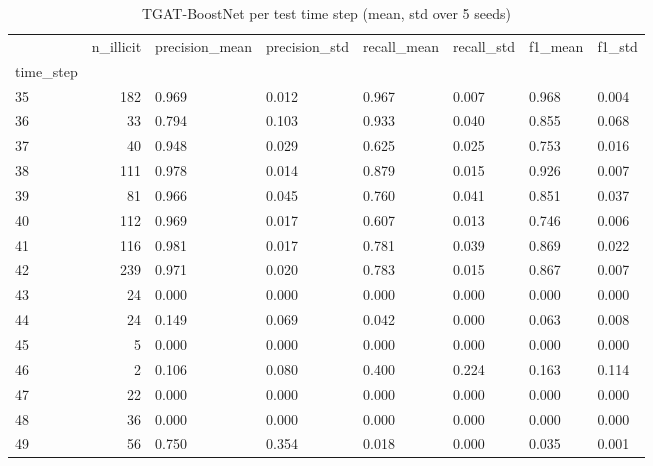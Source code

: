 \begin{table}
\caption{TGAT-BoostNet per test time step (mean, std over 5 seeds)}
\label{tab:02_per_timestep}
\begin{tabular}{lrllllll}
\toprule
 & n\_illicit & precision\_mean & precision\_std & recall\_mean & recall\_std & f1\_mean & f1\_std \\
time\_step &  &  &  &  &  &  &  \\
\midrule
35 & 182 & 0.969 & 0.012 & 0.967 & 0.007 & 0.968 & 0.004 \\
36 & 33 & 0.794 & 0.103 & 0.933 & 0.040 & 0.855 & 0.068 \\
37 & 40 & 0.948 & 0.029 & 0.625 & 0.025 & 0.753 & 0.016 \\
38 & 111 & 0.978 & 0.014 & 0.879 & 0.015 & 0.926 & 0.007 \\
39 & 81 & 0.966 & 0.045 & 0.760 & 0.041 & 0.851 & 0.037 \\
40 & 112 & 0.969 & 0.017 & 0.607 & 0.013 & 0.746 & 0.006 \\
41 & 116 & 0.981 & 0.017 & 0.781 & 0.039 & 0.869 & 0.022 \\
42 & 239 & 0.971 & 0.020 & 0.783 & 0.015 & 0.867 & 0.007 \\
43 & 24 & 0.000 & 0.000 & 0.000 & 0.000 & 0.000 & 0.000 \\
44 & 24 & 0.149 & 0.069 & 0.042 & 0.000 & 0.063 & 0.008 \\
45 & 5 & 0.000 & 0.000 & 0.000 & 0.000 & 0.000 & 0.000 \\
46 & 2 & 0.106 & 0.080 & 0.400 & 0.224 & 0.163 & 0.114 \\
47 & 22 & 0.000 & 0.000 & 0.000 & 0.000 & 0.000 & 0.000 \\
48 & 36 & 0.000 & 0.000 & 0.000 & 0.000 & 0.000 & 0.000 \\
49 & 56 & 0.750 & 0.354 & 0.018 & 0.000 & 0.035 & 0.001 \\
\bottomrule
\end{tabular}
\end{table}
